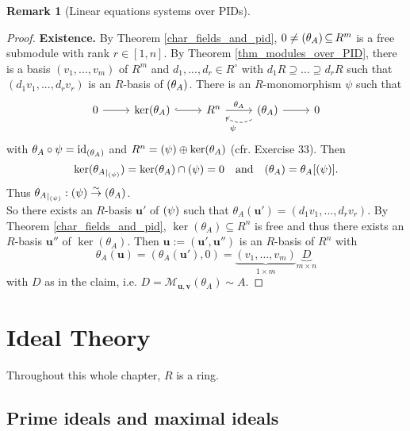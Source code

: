 \documentclass[12pt,a4paper]{report}
\theoremstyle{definition}
\newtheorem{Remark}[theorem]{Remark}
\theoremstyle{num.custom-title}
\DeclareMathOperator{\id}{id}
\let\o\relax %
\DeclareMathOperator{\o}{\mathsf{o}}
\let\Im\relax %
\DeclareMathOperator{\Im}{Im}
\DeclareMathOperator{\sse}{\subseteq}
\newcommand{\M}{\mathcal{M}}
\begin{document}
\begin{Remark}[Linear equations systems over PIDs]
\begin{proof}
\textbf{Existence.} By Theorem \ref{char_fields_and_pid}, $0 \neq \Im(\theta_A) \sse R^m$ is a free submodule with rank $r \in [1,n]$. By Theorem \ref{thm_modules_over_PID}, there is a basis $(v_1,...,v_m)$ of $R^m$ and $d_1,...,d_r \in R^\circ$ with $d_1 R \supseteq \ldots \supseteq d_r R$ such that $(d_1 v_1,...,d_r v_r)$ is an $R$-basis of $\Im(\theta_A)$. There is an $R$-monomorphism $\psi$ such that
\[
\begin{tikzcd}
0 \arrow{r} & \ker(\theta_A) \arrow[hookrightarrow]{r} & R^n \arrow{r}{\theta_A} & \Im(\theta_A) \arrow{r}{} \arrow[dashrightarrow, bend left]{l}{\psi} & 0
\end{tikzcd}
\]
with $\theta_A \circ \psi = \id_{\Im(\theta_A)}$ and $R^n = \Im(\psi) \oplus \ker(\theta_A)$ (cfr. Exercise 33). Then
\[
\ker({\theta_A}_{|_{\Im(\psi)}}) = \ker(\theta_A) \cap \Im(\psi)=0 \quad \text{and} \quad \Im(\theta_A) = \theta_A[\Im(\psi)].
\]
Thus ${\theta_A}_{|_{\Im(\psi)}} : \Im(\psi) \stackrel{\sim}{\to} \Im(\theta_A)$.\\
So there exists an $R$-basis $\mathbf{u}'$ of $\Im(\psi)$ such that $\theta_A(\mathbf{u}') = (d_1 v_1,...,d_r v_r)$. By Theorem \ref{char_fields_and_pid}, $\ker(\theta_A) \sse R^n$ is free and thus there exists an $R$-basis $\mathbf{u}''$ of $\ker(\theta_A)$. Then $\mathbf{u} := (\mathbf{u}',\mathbf{u}'')$ is an $R$-basis of $R^n$ with
\[
\theta_A(\mathbf{u}) = (\theta_A(\mathbf{u}'),0) = \underbrace{(v_1,\ldots,v_m)}_{1 \times m} \underbrace{D}_{m \times n}
\]
with $D$ as in the claim, i.e. $D = \M_{\mathbf{u},\mathbf{v}}(\theta_A) \sim A$.
\end{proof}
\end{Remark}






\chapter{Ideal Theory}

Throughout this whole chapter, $R$ is a ring.

\section{Prime ideals and maximal ideals}
\end{document}
